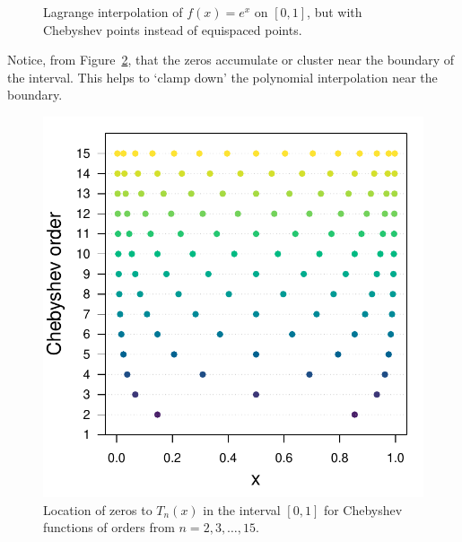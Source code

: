 \documentclass[11pt]{article}
\begin{document}
\begin{figure}[h!]
\begin{minipage}{0.48\textwidth}
\end{minipage}
\caption{Lagrange interpolation of \(f(x) = e^x\) on \([0,1]\), but with Chebyshev points instead of equispaced points.}\label{fig::cheb_pts}
\end{figure}
%
Notice, from Figure~\ref{fig::cheb_zeros}, that the zeros accumulate or cluster near the boundary of the interval.  This helps to `clamp down' the polynomial interpolation near the boundary.
%
\begin{figure}[h!]\centering

\begin{minipage}[c]{0.48\textwidth}
\includegraphics[width=\textwidth]{cheb_zeros.pdf}

\end{minipage}
\begin{minipage}[c]{0.48\textwidth}

\caption{Location of zeros to \(T_n(x)\) in the interval \([0, 1]\) for Chebyshev functions of orders from \(n=2, 3, \dots, 15\).}\label{fig::cheb_zeros}

\end{minipage}
\end{figure}


\end{document}
